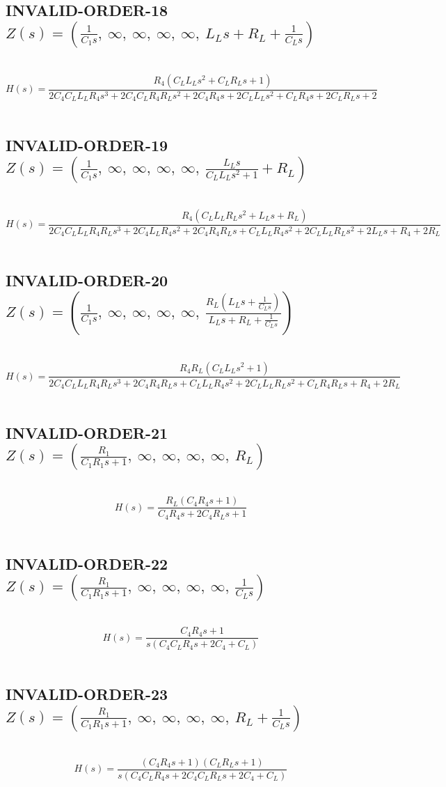 \documentclass{article}
\begin{document}
\subsection{INVALID-ORDER-18 $Z(s) = \left( \frac{1}{C_{1} s}, \  \infty, \  \infty, \  \infty, \  \infty, \  L_{L} s + R_{L} + \frac{1}{C_{L} s}\right)$ } \ 
\textbf{\[H(s) = \frac{R_{4} \left(C_{L} L_{L} s^{2} + C_{L} R_{L} s + 1\right)}{2 C_{4} C_{L} L_{L} R_{4} s^{3} + 2 C_{4} C_{L} R_{4} R_{L} s^{2} + 2 C_{4} R_{4} s + 2 C_{L} L_{L} s^{2} + C_{L} R_{4} s + 2 C_{L} R_{L} s + 2}\] } \ 
\subsection{INVALID-ORDER-19 $Z(s) = \left( \frac{1}{C_{1} s}, \  \infty, \  \infty, \  \infty, \  \infty, \  \frac{L_{L} s}{C_{L} L_{L} s^{2} + 1} + R_{L}\right)$ } \ 
\textbf{\[H(s) = \frac{R_{4} \left(C_{L} L_{L} R_{L} s^{2} + L_{L} s + R_{L}\right)}{2 C_{4} C_{L} L_{L} R_{4} R_{L} s^{3} + 2 C_{4} L_{L} R_{4} s^{2} + 2 C_{4} R_{4} R_{L} s + C_{L} L_{L} R_{4} s^{2} + 2 C_{L} L_{L} R_{L} s^{2} + 2 L_{L} s + R_{4} + 2 R_{L}}\] } \ 
\subsection{INVALID-ORDER-20 $Z(s) = \left( \frac{1}{C_{1} s}, \  \infty, \  \infty, \  \infty, \  \infty, \  \frac{R_{L} \left(L_{L} s + \frac{1}{C_{L} s}\right)}{L_{L} s + R_{L} + \frac{1}{C_{L} s}}\right)$ } \ 
\textbf{\[H(s) = \frac{R_{4} R_{L} \left(C_{L} L_{L} s^{2} + 1\right)}{2 C_{4} C_{L} L_{L} R_{4} R_{L} s^{3} + 2 C_{4} R_{4} R_{L} s + C_{L} L_{L} R_{4} s^{2} + 2 C_{L} L_{L} R_{L} s^{2} + C_{L} R_{4} R_{L} s + R_{4} + 2 R_{L}}\] } \ 
\subsection{INVALID-ORDER-21 $Z(s) = \left( \frac{R_{1}}{C_{1} R_{1} s + 1}, \  \infty, \  \infty, \  \infty, \  \infty, \  R_{L}\right)$ } \ 
\textbf{\[H(s) = \frac{R_{L} \left(C_{4} R_{4} s + 1\right)}{C_{4} R_{4} s + 2 C_{4} R_{L} s + 1}\] } \ 
\subsection{INVALID-ORDER-22 $Z(s) = \left( \frac{R_{1}}{C_{1} R_{1} s + 1}, \  \infty, \  \infty, \  \infty, \  \infty, \  \frac{1}{C_{L} s}\right)$ } \ 
\textbf{\[H(s) = \frac{C_{4} R_{4} s + 1}{s \left(C_{4} C_{L} R_{4} s + 2 C_{4} + C_{L}\right)}\] } \ 
\subsection{INVALID-ORDER-23 $Z(s) = \left( \frac{R_{1}}{C_{1} R_{1} s + 1}, \  \infty, \  \infty, \  \infty, \  \infty, \  R_{L} + \frac{1}{C_{L} s}\right)$ } \ 
\textbf{\[H(s) = \frac{\left(C_{4} R_{4} s + 1\right) \left(C_{L} R_{L} s + 1\right)}{s \left(C_{4} C_{L} R_{4} s + 2 C_{4} C_{L} R_{L} s + 2 C_{4} + C_{L}\right)}\] } \ 
\end{document}
